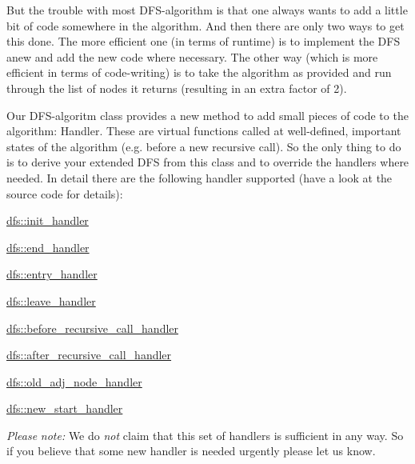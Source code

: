 But the trouble with most D\+F\+S-\/algorithm is that one always wants to add a little bit of code somewhere in the algorithm. And then there are only two ways to get this done. The more efficient one (in terms of runtime) is to implement the D\+FS anew and add the new code where necessary. The other way (which is more efficient in terms of code-\/writing) is to take the algorithm as provided and run through the list of nodes it returns (resulting in an extra factor of 2).

Our D\+F\+S-\/algoritm class provides a new method to add small pieces of code to the algorithm\+: Handler. These are virtual functions called at well-\/defined, important states of the algorithm (e.\+g. before a new recursive call). So the only thing to do is to derive your extended D\+FS from this class and to override the handlers where needed. In detail there are the following handler supported (have a look at the source code for details)\+:
\begin{DoxyItemize}
\item \mbox{\hyperlink{classdfs_aae46a50d0c73c63bf72e483668fd22a2}{dfs\+::init\+\_\+handler}}
\item \mbox{\hyperlink{classdfs_a59c512fa99ad3809db3e24347ab43b85}{dfs\+::end\+\_\+handler}}
\item \mbox{\hyperlink{classdfs_a6473b0a5d792d9e45c3d32dfdc5b5ffc}{dfs\+::entry\+\_\+handler}}
\item \mbox{\hyperlink{classdfs_abfe33292cd567f22596ba0c313481582}{dfs\+::leave\+\_\+handler}}
\item \mbox{\hyperlink{classdfs_a401190846f59af2a49ba036e99230152}{dfs\+::before\+\_\+recursive\+\_\+call\+\_\+handler}}
\item \mbox{\hyperlink{classdfs_a92fdca8a77b55d08b129aeab4fc66e4c}{dfs\+::after\+\_\+recursive\+\_\+call\+\_\+handler}}
\item \mbox{\hyperlink{classdfs_a33d1d2caa38dd038e03fa4041f5b9521}{dfs\+::old\+\_\+adj\+\_\+node\+\_\+handler}}
\item \mbox{\hyperlink{classdfs_a304b14458fb78f9feb3d8d5683d3cab5}{dfs\+::new\+\_\+start\+\_\+handler}}
\end{DoxyItemize}

{\itshape Please} {\itshape note\+:} We do {\itshape not} claim that this set of handlers is sufficient in any way. So if you believe that some new handler is needed urgently please let us know.

